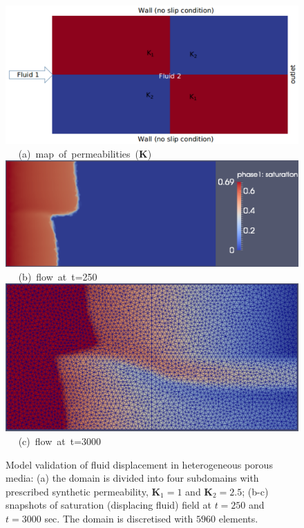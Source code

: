 \begin{figure}[ht] 
\vbox{
\hbox{\hspace{-0.3cm}
\includegraphics[width=.8\textwidth]{./Pics1/2b2_wi_fine/2b2_whole_in_fine_perm_1.pdf} 
}
\vspace{0.0cm}
\hbox{\hspace{3.5cm} (a) map of permeabilities ($\mathbf{K}$)
}
\vspace{0.25cm}
\hbox{\hspace{1.5cm}
\includegraphics[width=.9\textwidth]{./Pics1/2b2_wi_fine/2b2_whole_in_fine_250_2.pdf}
}
\vspace{0.0cm}
\hbox{\hspace{4.5cm} (b) flow at t=250  
}
\vspace{0.25cm}
\hbox{\hspace{1.5cm}
\includegraphics[width=.65\textwidth]{./Pics1/2b2_wi_fine/2b2_whole_in_fine_3000_1.pdf}
}
\vspace{0.0cm}
\hbox{\hspace{4.0cm} (c) flow at t=3000  
}
}     
\caption{Model validation of fluid displacement in heterogeneous porous media: (a) the domain is divided into four subdomains with prescribed synthetic permeability, $\mathbf{K}_{1}=1$ and $\mathbf{K}_{2}=2.5$; (b-c) snapshots of saturation (displacing fluid) field at $t=250$ and $t=3000$ sec. The domain is discretised with $5960$  elements. }
\label{fem_cv_represent_a}
\end{figure}
\clearpage



